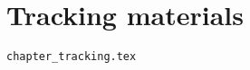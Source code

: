 \chapter{Tracking materials} %
\begin{flushright} {\tiny {\color{gray} \tt chapter\_tracking.tex}} \end{flushright}

 

